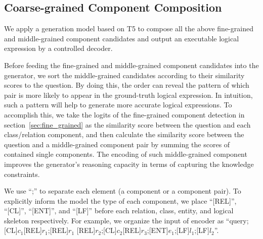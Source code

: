 \subsection{Coarse-grained Component Composition}
We apply a generation model based on T5 to compose all the above fine-grained and middle-grained component candidates and output an executable logical expression by a controlled decoder.

Before feeding the fine-grained and middle-grained component candidates into the generator, we sort the middle-grained candidates according to their similarity scores to the question. By doing this, the order can reveal the pattern of which pair is more likely to appear in the ground-truth logical expression. In intuition, such a pattern will help to generate more accurate logical expressions.
To accomplish this, we take the logits of the fine-grained component detection in section~\ref{sec:fine_grained} as the similarity score between the question and each class/relation component, and then calculate the similarity score between the question and a middle-grained component pair by summing the scores of contained single components. The encoding of such middle-grained component improves the generator's reasoning capacity in terms of capturing the knowledge constraints. 


We use ``;'' to separate each element (a component or a component pair). To explicitly inform the model the type of each component, we place ``[REL]'', ``[CL]'', ``[ENT]'', and ``[LF]''  before each relation, class, entity, and logical skeleton respectively. For example, we organize the input of encoder as 
``query;[CL]$c_1$[REL]$r_1$;[REL]$r_1$ [REL]$r_2$;[CL]$c_2$[REL]$r_3$;[ENT]$e_1$;[LF]$l_1$;[LF]$l_2$''.

